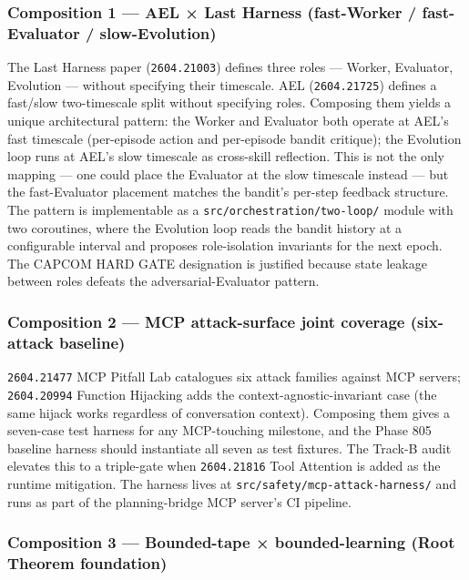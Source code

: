\documentclass[11pt,letterpaper]{article}
\newcommand{\arxivid}[1]{\texttt{\textcolor{accent}{#1}}}
\begin{document}
\subsubsection{Composition 1 --- AEL × Last Harness (fast-Worker /
fast-Evaluator /
slow-Evolution)}

The Last Harness paper (\arxivid{2604.21003}) defines three roles ---
Worker, Evaluator, Evolution --- without specifying their timescale. AEL
(\arxivid{2604.21725}) defines a fast/slow two-timescale split without
specifying roles. Composing them yields a unique architectural pattern:
the Worker and Evaluator both operate at AEL's fast timescale
(per-episode action and per-episode bandit critique); the Evolution loop
runs at AEL's slow timescale as cross-skill reflection. This is not the
only mapping --- one could place the Evaluator at the slow timescale
instead --- but the fast-Evaluator placement matches the bandit's
per-step feedback structure. The pattern is implementable as a
\texttt{src/orchestration/two-loop/} module with two coroutines, where
the Evolution loop reads the bandit history at a configurable interval
and proposes role-isolation invariants for the next epoch. The CAPCOM
HARD GATE designation is justified because state leakage between roles
defeats the adversarial-Evaluator pattern.

\subsubsection{Composition 2 --- MCP attack-surface joint coverage
(six-attack
baseline)}

\arxivid{2604.21477} MCP Pitfall Lab catalogues six attack families
against MCP servers; \arxivid{2604.20994} Function Hijacking adds the
context-agnostic-invariant case (the same hijack works regardless of
conversation context). Composing them gives a seven-case test harness
for any MCP-touching milestone, and the Phase 805 baseline harness
should instantiate all seven as test fixtures. The Track-B audit
elevates this to a triple-gate when \arxivid{2604.21816} Tool Attention
is added as the runtime mitigation. The harness lives at
\texttt{src/safety/mcp-attack-harness/} and runs as part of the
planning-bridge MCP server's CI pipeline.

\subsubsection{Composition 3 --- Bounded-tape × bounded-learning (Root
Theorem
foundation)}
\end{document}
